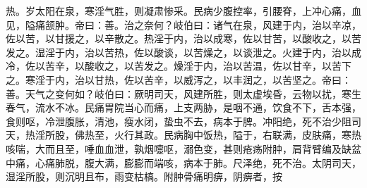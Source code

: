\documentclass[a4paper,12pt,UTF8,twoside]{ctexbook}
\begin{document}
热。岁太阳在泉，寒淫气胜，则凝肃惨采。民病少腹控率，引腰脊，上冲心痛，血见，隘痛颔肿。帝曰：善。治之奈何？岐伯曰：诸气在泉，风建于内，治以辛凉，佐以苦，以甘援之，以辛散之。热淫于内，治以成寒，佐以甘苦，以酸收之，以苦发之。湿淫于内，治以苦热，佐以酸谈，以苦燥之，以谈泄之。火建于内，治以成冷，佐以苦辛，以酸收之，以苦发之。燥淫于内，治以苦温，佐以甘辛，以苦下之。寒淫于内，治以甘热，佐以苦辛，以威泻之，以丰润之，以苦坚之。帝曰：善。天气之变何如？岐伯曰：厥明司天，风建所胜，则太虚埃昏，云物以扰，寒生春气，流水不冰。民痛胃院当心而痛，上支两胁，是咽不通，饮食不下，舌本强，食则呕，冷泄腹胀，清池，瘦水闭，蛰虫不去，病本于脾。冲阳绝，死不治少阻司天，热淫所股，佛热至，火行其政。民病胸中饭热，隘于，右联满，皮肤痛，寒热咳喘，大而且至，唾血血泄，孰烟嚏呕，溺色变，甚则疮疡附肿，肩背臂编及缺盆中痛，心痛肺脱，腹大满，膨膨而端咳，病本于肺。尺泽绝，死不治。太阴司天，湿淫所股，则沉明且布，雨变枯槁。附肿骨痛明痹，阴痹者，按
\end{document}
